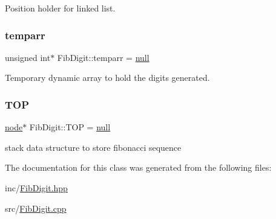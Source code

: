 Position holder for linked list. 

\mbox{\label{classFibDigit_a1e02ed6ccd14aa5075b0a7ebf5828e13}} 
\subsubsection{\texorpdfstring{temparr}{temparr}}
{\footnotesize\ttfamily unsigned int$\ast$ Fib\+Digit\+::temparr = \mbox{\hyperlink{FibDigit_8hpp_ac97b8ee753e4405397a42ad5799b0f9e}{null}}\hspace{0.3cm}{\ttfamily [protected]}}



Temporary dynamic array to hold the digits generated. 

\mbox{\label{classFibDigit_a2c820e980a3e4c69f118f3778fd84206}} 
\subsubsection{\texorpdfstring{T\+OP}{TOP}}
{\footnotesize\ttfamily \mbox{\hyperlink{structnode}{node}}$\ast$ Fib\+Digit\+::\+T\+OP = \mbox{\hyperlink{FibDigit_8hpp_ac97b8ee753e4405397a42ad5799b0f9e}{null}}\hspace{0.3cm}{\ttfamily [private]}}



stack data structure to store fibonacci sequence 



The documentation for this class was generated from the following files\+:\begin{DoxyCompactItemize}
\item 
inc/\mbox{\hyperlink{FibDigit_8hpp}{Fib\+Digit.\+hpp}}\item 
src/\mbox{\hyperlink{FibDigit_8cpp}{Fib\+Digit.\+cpp}}\end{DoxyCompactItemize}
